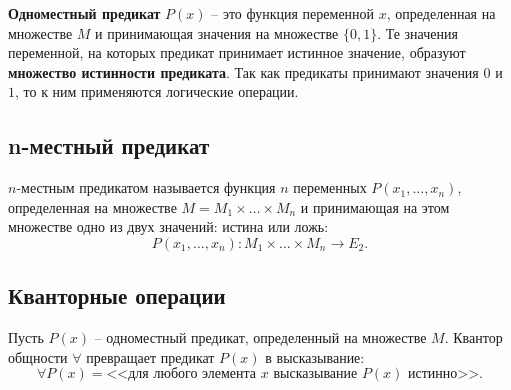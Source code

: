 \textbf{Одноместный предикат} \(P(x)\) -- это функция переменной \(x\), определенная на множестве \(M\) и принимающая значения на множестве \(\{0, 1\}\). Те значения переменной, на которых предикат принимает истинное значение, образуют \textbf{множество истинности предиката}. Так как предикаты принимают значения \(0\) и \(1\), то к ним применяются логические операции.


\subsection{n-местный предикат}

\(n\)-местным предикатом называется функция \(n\) переменных \(P(x_1, \ldots, x_n)\), определенная на множестве \(M = M_1 \times \ldots \times M_n\) и принимающая на этом множестве одно из двух значений: истина или ложь:
\[
    P(x_1, \ldots, x_n) : M_1 \times \ldots \times M_n \to E_2.
\]

\subsection{Кванторные операции}

Пусть \(P(x)\) -- одноместный предикат, определенный на множестве \(M\). Квантор общности \(\forall\) превращает предикат \(P(x)\) в высказывание:
\[
    \forall P(x) = \text{<<для любого элемента \(x\) высказывание \(P(x)\) истинно>>}.
\]

